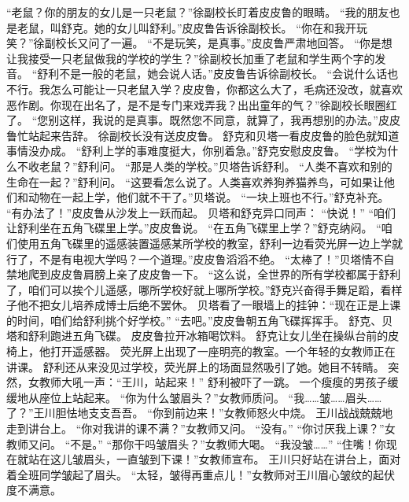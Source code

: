 \documentclass[a4paper,12pt,UTF8,twoside]{ctexbook}
\begin{document}
        “老鼠？你的朋友的女儿是一只老鼠？”徐副校长盯着皮皮鲁的眼睛。 
        “我的朋友也是老鼠，叫舒克。她的女儿叫舒利。”皮皮鲁告诉徐副校长。 
        “你在和我开玩笑？”徐副校长又问了一遍。 
        “不是玩笑，是真事。”皮皮鲁严肃地回答。 
        “你是想让我接受一只老鼠做我的学校的学生？”徐副校长加重了老鼠和学生两个字的发音。 
        “舒利不是一般的老鼠，她会说人话。”皮皮鲁告诉徐副校长。 
        “会说什么话也不行。我怎么可能让一只老鼠入学？皮皮鲁，你都这么大了，毛病还没改，就喜欢恶作剧。你现在出名了，是不是专门来戏弄我？出出童年的气？”徐副校长眼圈红了。 
        “您别这样，我说的是真事。既然您不同意，就算了，我再想别的办法。”皮皮鲁忙站起来告辞。 
        徐副校长没有送皮皮鲁。 
        舒克和贝塔一看皮皮鲁的脸色就知道事情没办成。 
        “舒利上学的事难度挺大，你别着急。”舒克安慰皮皮鲁。 
        “学校为什么不收老鼠？”舒利问。 
        “那是人类的学校。”贝塔告诉舒利。 
        “人类不喜欢和别的生命在一起？”舒利问。 
        “这要看怎么说了。人类喜欢养狗养猫养鸟，可如果让他们和动物在一起上学，他们就不干了。”贝塔说。 
        “一块上班也不行。”舒克补充。 
        “有办法了！”皮皮鲁从沙发上一跃而起。 
        贝塔和舒克异口同声： 
        “快说！” 
        “咱们让舒利坐在五角飞碟里上学。”皮皮鲁说。 
        “在五角飞碟里上学？”舒克纳闷。 
        “咱们使用五角飞碟里的遥感装置遥感某所学校的教室，舒利一边看荧光屏一边上学就行了，不是有电视大学吗？一个道理。”皮皮鲁滔滔不绝。 
        “太棒了！”贝塔情不自禁地爬到皮皮鲁肩膀上亲了皮皮鲁一下。 
        “这么说，全世界的所有学校都属于舒利了，咱们可以挨个儿遥感，哪所学校好就上哪所学校。”舒克兴奋得手舞足蹈，看样子他不把女儿培养成博士后绝不罢休。 
        贝塔看了一眼墙上的挂钟：“现在正是上课的时间，咱们给舒利挑个好学校。” 
        “去吧。”皮皮鲁朝五角飞碟挥挥手。 
        舒克、贝塔和舒利跑进五角飞碟。 
        皮皮鲁拉开冰箱喝饮料。 
        舒克让女儿坐在操纵台前的皮椅上，他打开遥感器。 
        荧光屏上出现了一座明亮的教室。一个年轻的女教师正在讲课。 
        舒利还从来没见过学校，荧光屏上的场面显然吸引了她。她目不转睛。 
        突然，女教师大吼一声：“王川，站起来！” 
        舒利被吓了一跳。 
        一个瘦瘦的男孩子缓缓地从座位上站起来。 
        “你为什么皱眉头？”女教师质问。 
        “我……皱……眉头……了？”王川胆怯地支支吾吾。 
        “你到前边来！”女教师怒火中烧。 
        王川战战兢兢地走到讲台上。 
        “你对我讲的课不满？”女教师又问。 
        “没有。” 
        “你讨厌我上课？”女教师又问。 
        “不是。” 
        “那你干吗皱眉头？”女教师大喝。 
        “我没皱……” 
        “住嘴！你现在就站在这儿皱眉头，一直皱到下课！”女教师宣布。 
        王川只好站在讲台上，面对着全班同学皱起了眉头。 
        “太轻，皱得再重点儿！”女教师对王川眉心皱纹的起伏度不满意。 
\end{document}
